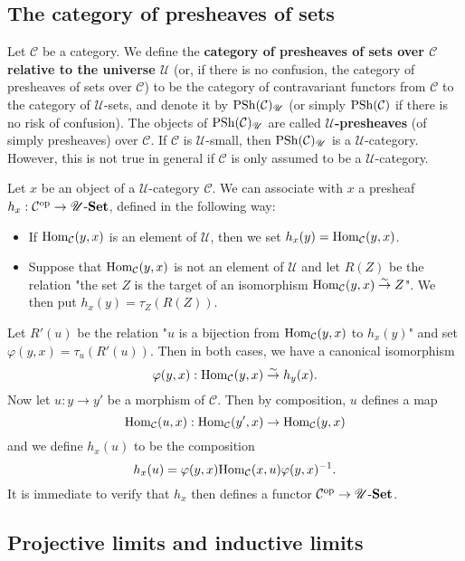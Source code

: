 \subsection{The category of presheaves of sets}
Let $\mathcal{C}$ be a category. We define the \textbf{category of presheaves of sets over $\mathcal{C}$ relative to the universe $\mathscr{U}$} (or, if there is no confusion, the category of presheaves of sets over $\mathcal{C}$) to be the category of contravariant functors from $\mathcal{C}$ to the category of $\mathscr{U}$-sets, and denote it by $\mathrm{PSh}(\mathcal{C})_{\mathscr{U}}$ (or simply $\mathrm{PSh}(\mathcal{C})$ if there is no risk of confusion). The objects of $\mathrm{PSh}(\mathcal{C})_{\mathscr{U}}$ are called \textbf{$\mathscr{U}$-presheaves} (of simply presheaves) over $\mathcal{C}$. If $\mathcal{C}$ is $\mathscr{U}$-small, then $\mathrm{PSh}(\mathcal{C})_{\mathscr{U}}$ is a $\mathscr{U}$-category. However, this is not true in general if $\mathcal{C}$ is only assumed to be a $\mathscr{U}$-category.\par
Let $x$ be an object of a $\mathscr{U}$-category $\mathcal{C}$. We can associate with $x$ a presheaf $h_x:\mathcal{C}^{\mathrm{op}}\to \mathscr{U}\text{-}\mathbf{Set}$, defined in the following way:
\begin{itemize}
\item If $\mathrm{Hom}_\mathcal{C}(y,x)$ is an element of $\mathscr{U}$, then we set $h_x(y)=\mathrm{Hom}_\mathcal{C}(y,x)$.
\item Suppose that $\mathrm{Hom}_\mathcal{C}(y,x)$ is not an element of $\mathscr{U}$ and let $R(Z)$ be the relation "the set $Z$ is the target of an isomorphism $\mathrm{Hom}_\mathcal{C}(y,x) \stackrel{\sim}{\to } Z$". We then put $h_x(y)=\tau_Z(R(Z))$.
\end{itemize}
Let $R'(u)$ be the relation "$u$ is a bijection from $\mathrm{Hom}_\mathcal{C}(y,x)$ to $h_x(y)$" and set $\varphi(y,x)=\tau_u(R'(u))$. Then in both cases, we have a canonical isomorphism
\[\varphi(y,x):\mathrm{Hom}_\mathcal{C}(y,x) \stackrel{\sim}{\to } h_y(x).\]
Now let $u:y\to y'$ be a morphism of $\mathcal{C}$. Then by composition, $u$ defines a map
\[\mathrm{Hom}_{\mathcal{C}}(u,x):\mathrm{Hom}_\mathcal{C}(y',x)\to \mathrm{Hom}_\mathcal{C}(y,x)\]
and we define $h_x(u)$ to be the composition
\[h_x(u)=\varphi(y,x)\mathrm{Hom}_\mathcal{C}(x,u)\varphi(y,x)^{-1}.\]
It is immediate to verify that $h_x$ then defines a functor $\mathcal{C}^{\mathrm{op}}\to \mathscr{U}\text{-}\mathbf{Set}$.
\subsection{Projective limits and inductive limits}
